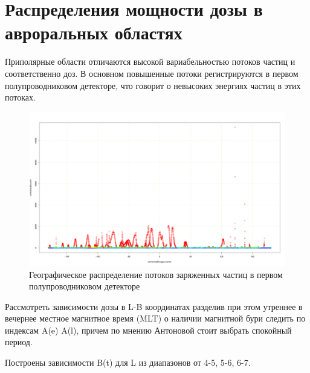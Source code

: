 \section{Распределения мощности дозы в авроральных областях}
Приполярные области отличаются высокой вариабельностью потоков частиц и соответственно доз. В основном повышенные потоки регистрируются в первом полупроводниковом детекторе, что говорит о невысоких энергиях частиц в этих потоках.

\begin{figure}[h]
	\includegraphics[width=0.8\linewidth]{images/Flash/depron_lat_map_148}
	\caption{Географическое распределение потоков заряженных частиц в первом полупроводниковом детекторе}
	\label{fig:depronlatmap148}
\end{figure}
Рассмотреть зависимости дозы в L-B координатах разделив при этом утреннее в вечернее местное магнитное время (MLT) о наличии магнитной бури следить по индексам A(e) A(l), причем по мнению Антоновой стоит выбрать спокойный период.

Построены зависимости B(t) для L из диапазонов от 4-5, 5-6, 6-7.

